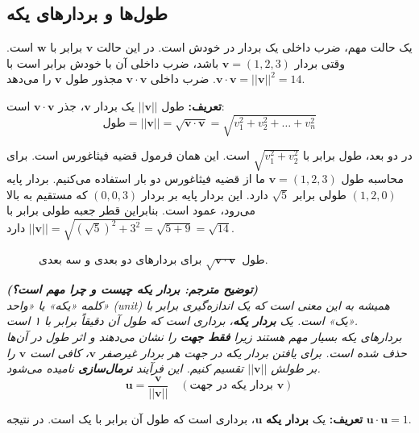 \documentclass[12pt, a4paper]{book}
\begin{document}
	\subsection*{طول‌ها و بردارهای یکه}
	یک حالت مهم، ضرب داخلی یک بردار در خودش است. در این حالت $\mathbf{v}$ برابر با $\mathbf{w}$ است. وقتی بردار $\mathbf{v}=(1,2,3)$ باشد، ضرب داخلی آن با خودش برابر است با $\mathbf{v} \cdot \mathbf{v} = ||\mathbf{v}||^2 = 14$. ضرب داخلی $\mathbf{v} \cdot \mathbf{v}$ مجذور طول $\mathbf{v}$ را می‌دهد.
	
	\begin{framed}
		\textbf{تعریف:} طول $||\mathbf{v}||$ یک بردار $\mathbf{v}$، جذر $\mathbf{v} \cdot \mathbf{v}$ است:
		\[ \text{طول} = ||\mathbf{v}|| = \sqrt{\mathbf{v} \cdot \mathbf{v}} = \sqrt{v_1^2 + v_2^2 + \dots + v_n^2} \]
	\end{framed}
	
	در دو بعد، طول برابر با $\sqrt{v_1^2 + v_2^2}$ است. این همان فرمول قضیه فیثاغورس است. برای محاسبه طول $\mathbf{v}=(1,2,3)$ ما از قضیه فیثاغورس دو بار استفاده می‌کنیم. بردار پایه $(1,2,0)$ طولی برابر $\sqrt{5}$ دارد. این بردار پایه بر بردار $(0,0,3)$ که مستقیم به بالا می‌رود، عمود است. بنابراین قطر جعبه طولی برابر با $||\mathbf{v}||=\sqrt{(\sqrt{5})^2+3^2}=\sqrt{5+9}=\sqrt{14}$ دارد.
	
	\begin{figure}[h!]
		\centering
		\caption{طول $\sqrt{\mathbf{v}\cdot\mathbf{v}}$ برای بردارهای دو بعدی و سه بعدی.}
	\end{figure}
	
	\vspace{5mm}
	\textit{\textbf{(توضیح مترجم: بردار یکه چیست و چرا مهم است؟)} \\
		کلمه «یکه» یا «واحد» (unit) همیشه به این معنی است که یک اندازه‌گیری برابر با «یک» است. یک \textbf{بردار یکه}، برداری است که طول آن دقیقاً برابر با ۱ است. \\
		بردارهای یکه بسیار مهم هستند زیرا \textbf{فقط جهت} را نشان می‌دهند و اثر طول در آن‌ها حذف شده است. برای یافتن بردار یکه در جهت هر بردار غیرصفر $\mathbf{v}$، کافی است $\mathbf{v}$ را بر طولش $||\mathbf{v}||$ تقسیم کنیم. این فرآیند \textbf{نرمال‌سازی} نامیده می‌شود.
		\[ \mathbf{u} = \frac{\mathbf{v}}{||\mathbf{v}||} \quad (\text{بردار یکه در جهت } \mathbf{v}) \]
	}
	\vspace{5mm}
	
	\begin{framed}
		\textbf{تعریف:} یک \textbf{بردار یکه} $\mathbf{u}$، برداری است که طول آن برابر با یک است. در نتیجه $\mathbf{u} \cdot \mathbf{u} = 1$.
	\end{framed}
	
\end{document}
